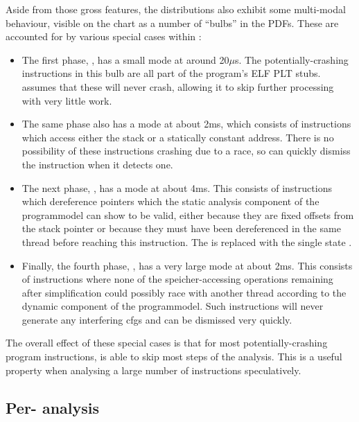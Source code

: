 Aside from those gross features, the distributions also exhibit some
multi-modal behaviour, visible on the chart as a number of ``bulbs''
in the PDFs.  These are accounted for by various special cases within
{\technique}:
\begin{itemize}
\item The first phase, , has a small mode
  at around 20$\mu$s.  The potentially-crashing instructions in this
  bulb are all part of the program's ELF PLT stubs.  {\Technique}
  assumes that these will never crash, allowing it to skip further
  processing with very little work.
\item The same phase also has a mode at about 2ms, which consists of
  instructions which access either the stack or a statically constant
  address.  There is no possibility of these instructions crashing due
  to a race, so {\technique} can quickly dismiss the instruction
  when it detects one.
\item The next phase, , has a mode at about 4ms.  This
  consists of instructions which dereference pointers which the static
  analysis component of the \gls{programmodel} can show to be valid,
  either because they are fixed offsets from the stack pointer or
  because they must have been dereferenced in the same thread before
  reaching this instruction.  The {\StateMachine} is replaced with the
  single state {\stSurvive}.
\item Finally, the fourth phase, , has a very large mode
  at about 2ms.  This consists of instructions where none of the
  \gls{speicher}-accessing operations remaining after {\StateMachine}
  simplification could possibly race with another thread according to
  the dynamic component of the \gls{programmodel}.  Such instructions
  will never generate any interfering \glspl{cfg} and can be dismissed
  very quickly.
\end{itemize}
The overall effect of these special cases is that for most
potentially-crashing program instructions, {\technique} is able
to skip most steps of the analysis.  This is a useful property when
analysing a large number of instructions speculatively.

\subsection{Per- analysis}
\label{sect:eval:how:per_interfering}

